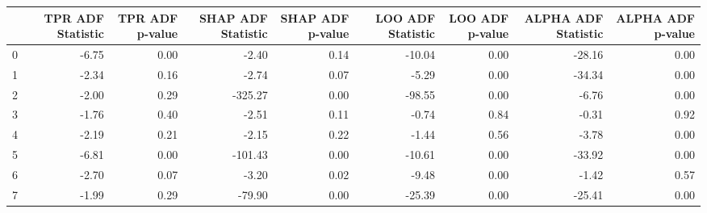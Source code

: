 \begin{tabular}{lrrrrrrrr}
\toprule
 & TPR ADF Statistic & TPR ADF p-value & SHAP ADF Statistic & SHAP ADF p-value & LOO ADF Statistic & LOO ADF p-value & ALPHA ADF Statistic & ALPHA ADF p-value \\
\midrule
0 & -6.75 & 0.00 & -2.40 & 0.14 & -10.04 & 0.00 & -28.16 & 0.00 \\
1 & -2.34 & 0.16 & -2.74 & 0.07 & -5.29 & 0.00 & -34.34 & 0.00 \\
2 & -2.00 & 0.29 & -325.27 & 0.00 & -98.55 & 0.00 & -6.76 & 0.00 \\
3 & -1.76 & 0.40 & -2.51 & 0.11 & -0.74 & 0.84 & -0.31 & 0.92 \\
4 & -2.19 & 0.21 & -2.15 & 0.22 & -1.44 & 0.56 & -3.78 & 0.00 \\
5 & -6.81 & 0.00 & -101.43 & 0.00 & -10.61 & 0.00 & -33.92 & 0.00 \\
6 & -2.70 & 0.07 & -3.20 & 0.02 & -9.48 & 0.00 & -1.42 & 0.57 \\
7 & -1.99 & 0.29 & -79.90 & 0.00 & -25.39 & 0.00 & -25.41 & 0.00 \\
\bottomrule
\end{tabular}
